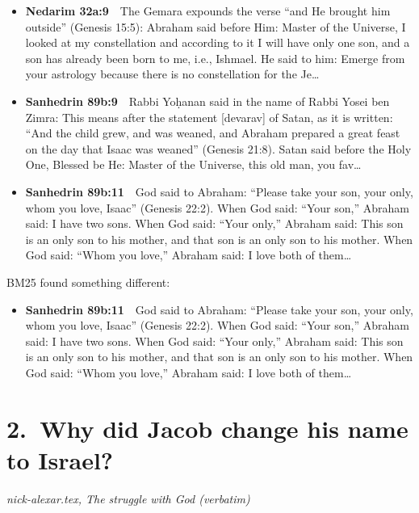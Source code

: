 \documentclass[11pt,a4paper]{article}
\begin{document}
\begin{itemize}[leftmargin=1.2em,itemsep=3pt]
\item {\color{ref}\textbf{Nedarim 32a:9}}\ \ The Gemara expounds the verse “and He brought him outside” (Genesis 15:5): Abraham said before Him: Master of the Universe, I looked at my constellation and according to it I will have only one son, and a son has already been born to me, i.e., Ishmael. He said to him: Emerge from your astrology because there is no constellation for the Je\ldots
\item {\color{ref}\textbf{Sanhedrin 89b:9}}\ \ Rabbi Yoḥanan said in the name of Rabbi Yosei ben Zimra: This means after the statement [devarav] of Satan, as it is written: “And the child grew, and was weaned, and Abraham prepared a great feast on the day that Isaac was weaned” (Genesis 21:8). Satan said before the Holy One, Blessed be He: Master of the Universe, this old man, you fav\ldots
\item {\color{ref}\textbf{Sanhedrin 89b:11}}\ \ God said to Abraham: “Please take your son, your only, whom you love, Isaac” (Genesis 22:2). When God said: “Your son,” Abraham said: I have two sons. When God said: “Your only,” Abraham said: This son is an only son to his mother, and that son is an only son to his mother. When God said: “Whom you love,” Abraham said: I love both of them\ldots
\end{itemize}
{\color{quiet}\small BM25 found something different:}
\begin{itemize}[leftmargin=1.2em]
\item {\color{ref}\textbf{Sanhedrin 89b:11}}\ \ God said to Abraham: “Please take your son, your only, whom you love, Isaac” (Genesis 22:2). When God said: “Your son,” Abraham said: I have two sons. When God said: “Your only,” Abraham said: This son is an only son to his mother, and that son is an only son to his mother. When God said: “Whom you love,” Abraham said: I love both of them\ldots
\end{itemize}

\section*{2.\ Why did Jacob change his name to Israel?}
{\color{quiet}\small\textit{nick-alexar.tex, The struggle with God (verbatim)}}
\end{document}
